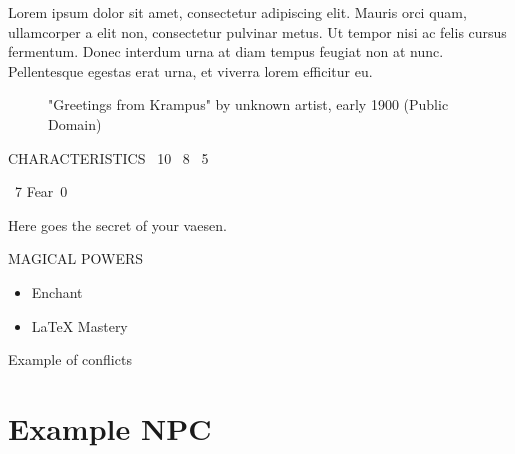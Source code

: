 \documentclass[english]{vaesen-supplement}
\begin{document}
Lorem ipsum dolor sit amet, consectetur adipiscing elit. Mauris orci quam, ullamcorper a elit non, consectetur pulvinar metus. Ut tempor nisi ac felis cursus fermentum. Donec interdum urna at diam tempus feugiat non at nunc. Pellentesque egestas erat urna, et viverra lorem efficitur eu.

\begin{figure}[!b]
    \centering
    {\footnotesize "Greetings from Krampus" by unknown artist, early 1900 (Public Domain)}
\end{figure}

\newpage

\begin{panel}{CHARACTERISTICS}
~10 \quad
{}~8 \quad
{}~5 \par
{}~7 \quad
Fear~0
\end{panel}

\begin{note}
    Here goes the secret of your vaesen. 
\end{note}

\begin{panel}{MAGICAL POWERS}
\begin{itemize}
    \item Enchant
    \item LaTeX Mastery
\end{itemize}
\end{panel}

Example of conflicts


\clearpage

\section{Example NPC}
\end{document}
